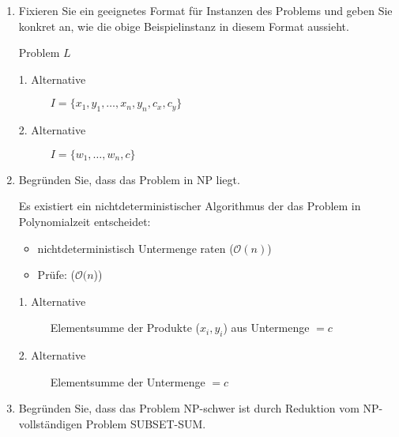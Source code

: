 \documentclass{lehramt-informatik-aufgabe}
\begin{document}
\begin{enumerate}


\item Fixieren Sie ein geeignetes Format für Instanzen des Problems und
geben Sie konkret an, wie die obige Beispielinstanz in diesem Format
aussieht.

\begin{liAntwort}
Problem $L$
\begin{description}
\item[1. Alternative]
$I = \{ x_1, y_1, \dots, x_n, y_n, c_x, c_y \}$

\item[2. Alternative]
$I = \{ w_1, \dots, w_n, c \}$
\end{description}
\end{liAntwort}


\item Begründen Sie, dass das Problem in NP liegt.

\begin{liAntwort}
Es existiert ein nichtdeterministischer Algorithmus der das Problem in
Polynomialzeit entscheidet:

\begin{itemize}
\item nichtdeterministisch Untermenge raten ($\mathcal{O}(n)$)
\item Prüfe: ($\mathcal{O}(n$))
\end{itemize}

\begin{description}
\item[1. Alternative]

Elementsumme der Produkte ($x_i, y_i$) aus Untermenge $= c$

\item[2. Alternative]

Elementsumme der Untermenge $= c$
\end{description}
\end{liAntwort}


\item Begründen Sie, dass das Problem NP-schwer ist durch Reduktion vom
NP-vollständigen Problem SUBSET-SUM.

\begin{liAntwort}

\begin{description}


\end{description}
\end{liAntwort}
\end{enumerate}
\end{document}
